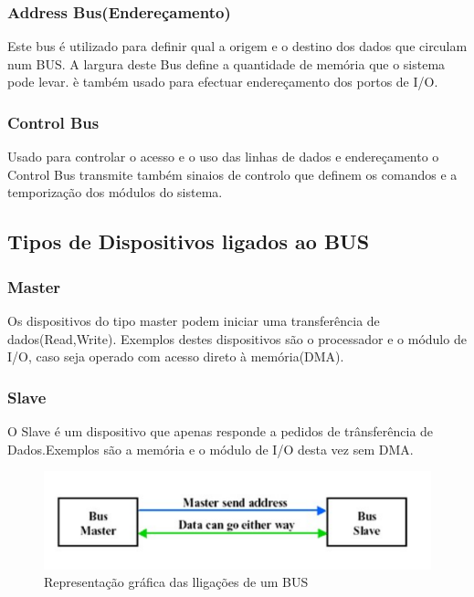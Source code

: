 \documentclass[10pt,a4paper]{paper}
\begin{document}
	\subsubsection*{Address Bus(Endereçamento)}
	Este bus é utilizado para definir qual a origem e o destino dos dados que circulam num BUS. A largura deste Bus define a  quantidade de memória que o sistema pode levar. è também usado para efectuar endereçamento dos portos de I/O.
	
	\subsubsection*{Control Bus}
	
	Usado para controlar o acesso e o uso das linhas de dados e endereçamento o Control Bus  transmite também sinaios de controlo que definem os comandos e a temporização dos módulos do sistema.
	
	\subsection*{Tipos de Dispositivos ligados ao BUS}
	
	\subsubsection*{Master}
	Os dispositivos do tipo master podem iniciar uma transferência de dados(Read,Write). Exemplos destes dispositivos são o processador e o módulo de I/O, caso seja operado com acesso direto à memória(DMA).

	\subsubsection*{Slave}
	O Slave é um dispositivo que apenas responde a pedidos de trânsferência de Dados.Exemplos são a memória e o módulo de I/O desta vez sem DMA.
	
	\begin{figure}[ht]
		\includegraphics[scale=0.4]{fig2.png}
		\centering
		\caption{Representação gráfica das lligações de um BUS}
		\label{fig:figura2 }
	\end{figure}
	
\end{document}
